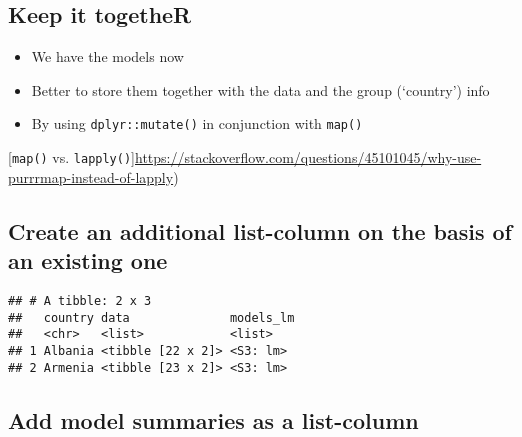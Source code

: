 \documentclass[]{article}
\newenvironment{Shaded}{\begin{snugshade}}{\end{snugshade}}
\newcommand{\KeywordTok}[1]{\textcolor[rgb]{0.13,0.29,0.53}{\textbf{#1}}}
\newcommand{\DataTypeTok}[1]{\textcolor[rgb]{0.13,0.29,0.53}{#1}}
\newcommand{\DecValTok}[1]{\textcolor[rgb]{0.00,0.00,0.81}{#1}}
\newcommand{\StringTok}[1]{\textcolor[rgb]{0.31,0.60,0.02}{#1}}
\newcommand{\OperatorTok}[1]{\textcolor[rgb]{0.81,0.36,0.00}{\textbf{#1}}}
\newcommand{\NormalTok}[1]{#1}
\providecommand{\tightlist}{%
  \setlength{\itemsep}{0pt}\setlength{\parskip}{0pt}}
\begin{document}
\subsection{Keep it togetheR}\label{keep-it-together}

\begin{itemize}
\tightlist
\item
  We have the models now
\item
  Better to store them together with the data and the group (`country')
  info
\item
  By using \texttt{dplyr::mutate()} in conjunction with \texttt{map()}
\end{itemize}

{[}\texttt{map()} vs.
\texttt{lapply()}{]}\url{https://stackoverflow.com/questions/45101045/why-use-purrrmap-instead-of-lapply})

\subsection{Create an additional list-column on the basis of an existing
one}\label{create-an-additional-list-column-on-the-basis-of-an-existing-one}

\begin{Shaded}
\end{Shaded}

\begin{verbatim}
## # A tibble: 2 x 3
##   country data              models_lm
##   <chr>   <list>            <list>   
## 1 Albania <tibble [22 x 2]> <S3: lm> 
## 2 Armenia <tibble [23 x 2]> <S3: lm>
\end{verbatim}

\subsection{Add model summaries as a
list-column}\label{add-model-summaries-as-a-list-column}

\begin{Shaded}
\end{Shaded}
\end{document}
